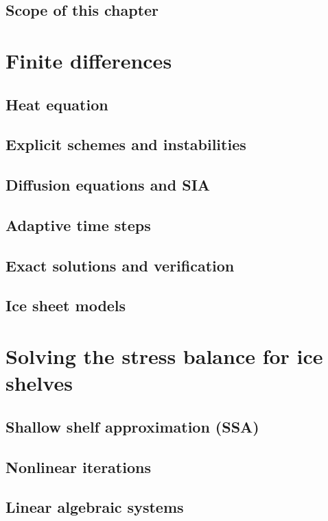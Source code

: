   \subsection{ Scope of this chapter}

 \section{ Finite differences}
  
    \subsection{ Heat equation}
     \subsection{ Explicit schemes and instabilities}
     \subsection{ Diffusion equations and SIA}
     \subsection{ Adaptive time steps}
     \subsection{ Exact solutions and verification}
     \subsection{ Ice sheet models}
  
  \section{ Solving the stress balance for ice shelves}
  
     \subsection{ Shallow shelf approximation (SSA)}
     \subsection{ Nonlinear iterations}
     \subsection{ Linear algebraic systems}
